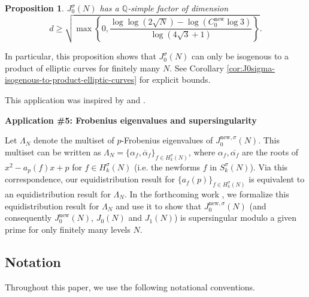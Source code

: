 \documentclass[11pt,letterpaper,reqno]{amsart}
\newtheorem{proposition}[theorem]{Proposition}
\theoremstyle{definition}
\numberwithin{equation}{section}
\numberwithin{figure}{section}
\numberwithin{table}{section}
\let\subsectiontemp\subsection
\renewcommand{\subsection}[1]{ 
    \subsectiontemp{#1} \hfill\vspace{0.5\linespacing} 
}
\newcommand{\QQ}{\mathbb{Q}}
\newcommand{\nw}{\mathrm{new}}
\begin{document}
\begin{proposition}\label{prop:lower-bound-dimension-q-simple-factor}
$J_0^{\sigma}(N)$ has a $\QQ$-simple factor of dimension 
$$d \geq \sqrt{\max \left\{ 0, \frac{\log \log (2 \sqrt{N} ) - \log (C_0^\nw \log 3)}{\log (4\sqrt{3} + 1)} \right\}}.$$
\end{proposition}
In particular, this proposition shows that $J_0^\sigma(N)$ can only be isogenous to a product of elliptic curves for finitely many $N$. See Corollary \ref{cor:J0sigma-isogenous-to-product-elliptic-curves} for explicit bounds.

This application was inspired by \cite[\S6.2]{Ser97} and \cite[\S16]{MS07}.


\vspace{4mm}
\textbf{Application \#5: Frobenius eigenvalues and supersingularity}

Let $\Lambda_N$ denote the multiset of $p$-Frobenius eigenvalues of $J_0^{\nw, \sigma}(N)$. This multiset can be written as
$\Lambda_N = \{\alpha_f, \overline{\alpha}_f \}_{f\in H_k^\sigma(N)}$, where $\alpha_f, \overline{\alpha_f}$ are the roots of $x^2 - a_p(f) x + p$ for $f \in H_k^\sigma(N)$ (i.e. the newforms $f$ in $S_k^\sigma(N)$). Via this correspondence, our equidistribution result for $\{a_f(p)\}_{f \in H_k^\sigma(N)}$ is equivalent to an equidistribution result for $\Lambda_N$. In the forthcoming work \cite{supersingularity}, we formalize this equidistribution result for $\Lambda_N$ and use it to show that $J_0^{\nw, \sigma}(N)$ (and consequently $J_0^{\nw}(N)$, $J_0(N)$ and $J_1(N)$) is supersingular modulo a given prime for only finitely many levels $N.$


\subsection{Notation}

Throughout this paper, we use the following notational conventions.
\end{document}
